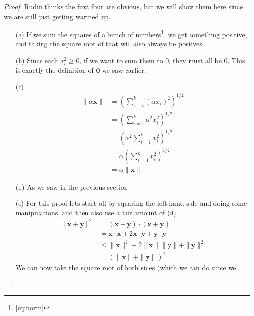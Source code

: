 \begin{proof}
    Rudin thinks the first four are obvious, but we will show them here since we
    are still just getting warmed up.
    \begin{itemize}
        \item[(a)] If we sum the squares of a bunch of numbers\footnote{\ref{eq:norm}},
            we get something positive, and taking the square root of that will also
            always be postives.
        \item[(b)] Since each $x_i^2 \geq 0$, if we want to sum them to 0, they
            must all be 0. This is exactly the definition of $\mathbf{0}$ we saw
            earlier.
        \item[(c)]
            \begin{align}
                \|\alpha\mathbf{x}\| & = \left(\sum_{i=1}^k (\alpha x_i)^2\right)^{1/2} \\
                                     & = \left(\sum_{i=1}^k \alpha^2 x_i^2\right)^{1/2} \\
                                     & = \left(\alpha^2\sum_{i=1}^k x_i^2\right)^{1/2}  \\
                                     & = \alpha\left(\sum_{i=1}^k x_i^2\right)^{1/2}    \\
                                     & = \alpha\|\mathbf{x}\|
            \end{align}
        \item[(d)] As we saw in the previous section
        \item[(e)] For this proof lets start off by squaring the left hand side
            and doing some manipulations, and then also use a fair amount of (d).
            \begin{align}
                \|\mathbf{x} + \mathbf{y}\|^2 & = (\mathbf{x} + \mathbf{y})\cdot(\mathbf{x} + \mathbf{y})                            \\
                                              & = \mathbf{x}\cdot\mathbf{x} + 2\mathbf{x}\cdot\mathbf{y} + \mathbf{y}\cdot\mathbf{y} \\
                                              & \leq \|\mathbf{x}\|^2 + 2\|\mathbf{x}\|\|\mathbf{y}\| + \|\mathbf{y}\|^2             \\
                                              & = \left(\|\mathbf{x}\| + \|\mathbf{y}\|\right)^2
            \end{align}
            We can now take the square root of both sides (which we can do since we

\end{itemize}
\end{proof}
